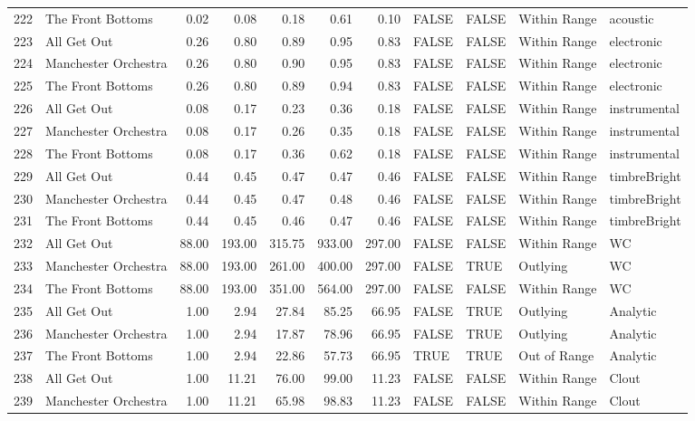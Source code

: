 \begin{table}[ht]
\begin{tabular}{rlrrrrrllll}
  222 & The Front Bottoms & 0.02 & 0.08 & 0.18 & 0.61 & 0.10 & FALSE & FALSE & Within Range & acoustic \\ 
  223 & All Get Out & 0.26 & 0.80 & 0.89 & 0.95 & 0.83 & FALSE & FALSE & Within Range & electronic \\ 
  224 & Manchester Orchestra & 0.26 & 0.80 & 0.90 & 0.95 & 0.83 & FALSE & FALSE & Within Range & electronic \\ 
  225 & The Front Bottoms & 0.26 & 0.80 & 0.89 & 0.94 & 0.83 & FALSE & FALSE & Within Range & electronic \\ 
  226 & All Get Out & 0.08 & 0.17 & 0.23 & 0.36 & 0.18 & FALSE & FALSE & Within Range & instrumental \\ 
  227 & Manchester Orchestra & 0.08 & 0.17 & 0.26 & 0.35 & 0.18 & FALSE & FALSE & Within Range & instrumental \\ 
  228 & The Front Bottoms & 0.08 & 0.17 & 0.36 & 0.62 & 0.18 & FALSE & FALSE & Within Range & instrumental \\ 
  229 & All Get Out & 0.44 & 0.45 & 0.47 & 0.47 & 0.46 & FALSE & FALSE & Within Range & timbreBright \\ 
  230 & Manchester Orchestra & 0.44 & 0.45 & 0.47 & 0.48 & 0.46 & FALSE & FALSE & Within Range & timbreBright \\ 
  231 & The Front Bottoms & 0.44 & 0.45 & 0.46 & 0.47 & 0.46 & FALSE & FALSE & Within Range & timbreBright \\ 
  232 & All Get Out & 88.00 & 193.00 & 315.75 & 933.00 & 297.00 & FALSE & FALSE & Within Range & WC \\ 
  233 & Manchester Orchestra & 88.00 & 193.00 & 261.00 & 400.00 & 297.00 & FALSE & TRUE & Outlying & WC \\ 
  234 & The Front Bottoms & 88.00 & 193.00 & 351.00 & 564.00 & 297.00 & FALSE & FALSE & Within Range & WC \\ 
  235 & All Get Out & 1.00 & 2.94 & 27.84 & 85.25 & 66.95 & FALSE & TRUE & Outlying & Analytic \\ 
  236 & Manchester Orchestra & 1.00 & 2.94 & 17.87 & 78.96 & 66.95 & FALSE & TRUE & Outlying & Analytic \\ 
  237 & The Front Bottoms & 1.00 & 2.94 & 22.86 & 57.73 & 66.95 & TRUE & TRUE & Out of Range & Analytic \\ 
  238 & All Get Out & 1.00 & 11.21 & 76.00 & 99.00 & 11.23 & FALSE & FALSE & Within Range & Clout \\ 
  239 & Manchester Orchestra & 1.00 & 11.21 & 65.98 & 98.83 & 11.23 & FALSE & FALSE & Within Range & Clout \\ 

\end{tabular}
\end{table}
